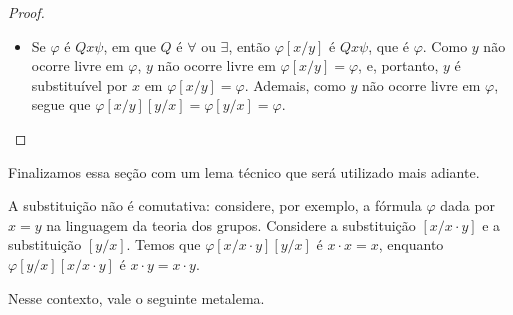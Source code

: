 \begin{proof}
\begin{itemize}
        Verifiquemos que nesse caso, com mais detalhes, $y$ é substituível por $x$ em $Q z \psi[x/y]$.
        Se $z=y$, isso é imediato, pois não há ocorrências livres de $y$ em $Qy\psi[x/y]$.
        Se $z\neq y$, então $y$ não ocorre livre em $\psi$.
        Além disso, pelo Metalema~\ref{mlem:criteriosSubstituibilidade}, $x$ é substituível por $y$ em $\psi$.
        Portanto, por hipótese indutiva, $y$ é substituível por $x$ em $\psi[x/y]$.
        Por hipótese, $z$ é diferente de $x$, logo, $z$ não ocorre em $x$.
        Assim, $y$ é substituível por $x$ em $Q z \psi[x/y]$.

        Se $z\neq y$, então, pela hipótese indutiva, $x$ não ocorre livre em $\psi[x/y]$.
        Se $z=y$, então, como veremos abaixo, $x$ não ocorre livre em $\psi$ e, portanto, não ocorre livre em $\psi[x/y]$.
        Logo, em qualquer caso, $x$ não ocorre livre em $Qz\psi[x/y]$.

        Se $z\neq y$, então $\varphi[x/y][y/x]=Qz\psi[x/y][y/x]$, que é $Qz\psi$ pela hipótese indutiva.

        Se $z=y$, então $\varphi[x/y][y/x]$ é $Qz\psi[x/y]$.
        Como $x$ é substituível por $y$ em $Qy\psi$ e $y$ ocorre no termo $y$, segue do Metalema~\ref{mlem:criteriosSubstituibilidade} que $x$ não ocorre livre em $\psi$, e, portanto, $Qz\psi[x/y]$ é $Qz\psi$, ou seja, $\varphi$.

        \item Se $\varphi$ é $Q x \psi$, em que $Q$ é $\forall$ ou $\exists$, então $\varphi[x/y]$ é $Q x \psi$, que é $\varphi$.
        Como $y$ não ocorre livre em $\varphi$, $y$ não ocorre livre em $\varphi[x/y]=\varphi$, e, portanto, $y$ é substituível por $x$ em $\varphi[x/y]=\varphi$.
        Ademais, como $y$ não ocorre livre em $\varphi$, segue que $\varphi[x/y][y/x]=\varphi[y/x]=\varphi$.
    \end{itemize}
\end{proof}

Finalizamos essa seção com um lema técnico que será utilizado mais adiante.

A substituição não é comutativa: considere, por exemplo, a fórmula $\varphi$ dada por $x=y$ na linguagem da teoria dos grupos.
Considere a substituição $[x/x\cdot y]$ e a substituição $[y/x]$.
Temos que $\varphi[x/x\cdot y][y/x]$ é $x\cdot x = x$, enquanto $\varphi[y/x][x/x\cdot y]$ é $x\cdot y = x\cdot y$.

Nesse contexto, vale o seguinte metalema.

